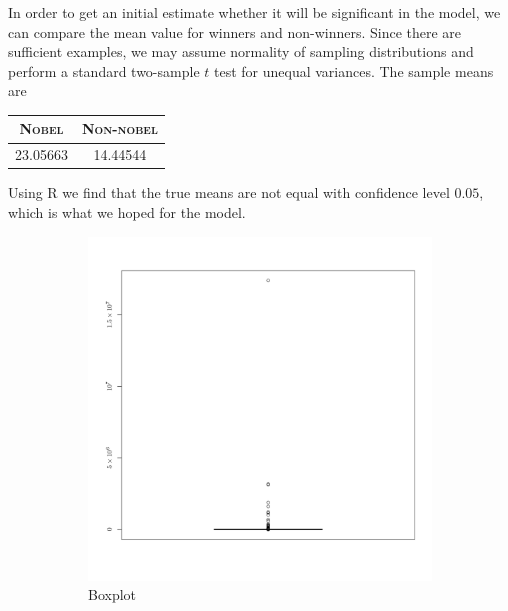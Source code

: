 In order to get an initial estimate whether it will be significant in the model, we can compare the mean value for winners and non-winners. Since there are sufficient examples, we may assume normality of sampling distributions and perform a standard two-sample $t$ test for unequal variances. The sample means are 
\begin{table}[H]
\centering
\begin{tabular}{c|c}
\textbf{\textsc{Nobel}} & \textbf{\textsc{Non-nobel}} \\ \hline
\rule{0pt}{4mm}23.05663&14.44544\\
\end{tabular}
\end{table} 
\noindent Using R we find that the true means are not equal with confidence level $0.05$, which is what we hoped for the model.
\begin{figure}[htb]
    \centering
    \begin{subfigure}[b]{0.3\textwidth}
        \includegraphics[width=\textwidth]{figures/popuInitialBox.pdf}
        \caption{Boxplot}
        \label{fig:popuInitialBox}
    \end{subfigure}
    \quad
    \begin{subfigure}[b]{0.3\textwidth}

\end{subfigure}
\end{figure}
